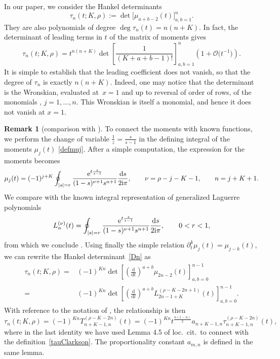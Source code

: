 \documentclass[pdftex]{sigma}
\numberwithin{equation}{section}
\theoremstyle{definition}
\newtheorem{Remark}[Theorem]{Remark}
\def\le{\left}
\def\ri{\right}
\def \d{{\mathrm d}}
\def\be{\begin{equation}}
\def\ee{\end{equation}}
\def\pa{\partial}
\begin{document}
In our paper, we consider the Hankel determinants
\be
\label{Dn}
\tau_n(t; {K}, {\rho} ):= \det \bigl[\mu_{a+b-2}(t)\bigr]_{a,b=1}^n.
\ee
They are also polynomials of degree
$
\deg \tau_n(t) = n(n+{K})$.
In fact, the determinant of leading terms in $t$ of the matrix of moments gives
\[
\tau_n(t; {K}, {\rho}) = t^{n(n+{K})} \det \le[\frac 1{( {K} + a+b-1)!} \ri]_{a,b=1}^n \le(1 + \mathcal O\bigl(t^{-1}\bigr)\ri).
\]
 It is simple to establish that the leading coefficient does not vanish, so that the degree of $\tau_n$ is exactly $n(n+{K})$. Indeed, one may notice that the determinant is the Wronskian, evaluated at~${x=1}$ and up to reversal of order of rows, of the monomials
, $j=1,\dots, n$. This Wronskian is itself a monomial, and hence it does not vanish at $x=1$.

\begin{Remark}[comparison with \cite{ClarksonDunning}]\label{CDcomp}
To connect the moments with known functions, we perform the change of variable $\frac 1 z = \frac s{s-1}$ in the defining integral of the moments $\mu_j(t)$ \eqref{defmuj}. After a simple computation, the expression for the moments becomes
\[
\mu_j(t) = (-1)^{j+{K}} \oint_{|s|= r} \frac { {\rm e}^{t \frac s{s-1}}}{(1-s)^{\nu + 1} s^{n+1}} \frac{\d s}{2{\rm i}\pi}, \qquad \nu = {\rho}-j-{K}-1,\qquad n = j + {K}+1.
\]
We compare with the known integral representation of generalized Laguerre polynomials
\[
L^{(\nu)}_n(t) = \oint_{|s|=r} \frac{{\rm e}^{t \frac s{s-1}}}{(1-s)^{\nu+1} s^{n+1}} \frac{ \d s}{2{\rm i}\pi},
\qquad 0<r<1,
\]
from which we conclude
.
Using finally the simple relation $\pa_t^k \mu_j(t) \allowbreak= \mu_{j-k}(t)$, we can rewrite the Hankel determinant~\eqref{Dn} as
\begin{align*}
\tau_n(t; {K}, {\rho}) = {}&(-1)^{ {K} n} \det \le[ \le(\frac{\d}{\d t} \ri)^{a+b}\mu_{2n-2}(t)
\ri]_{a,b=0}^{n-1}\\
={}& (-1)^{ {K} n} \det \le[ \le(\frac{\d}{\d t} \ri)^{a+b} L^{ ({\rho}-{K} - 2n+1)} _{2n-1 + {K}} (t)
\ri]_{a,b=0}^{n-1}.
\end{align*}
With reference to the notation of \cite[Definition 3.1]{ClarksonDunning}, the relationship is then
\[
\tau_n(t; {K}, {\rho})= (-1)^{ {K} n} T^{({\rho}-{K} - 2n)}_{n+ {K}-1, n}(t)= (-1)^{ {K} n} t^{\frac{n(1-n)}2} a_{n+ {K}-1,n}
\tau^{({\rho}-{K} - 2n)}_{n+ {K}-1, n}(t),
\]
where in the last identity we have used Lemma 4.5 of loc.\ cit.\ to connect with the definition~\eqref{tauClarkson}. The proportionality constant $a_{m,n}$ is defined in the same lemma.
\end{Remark}
\end{document}
